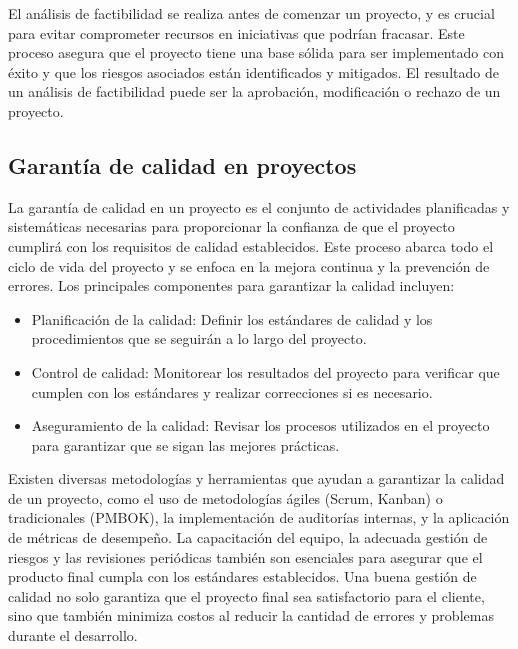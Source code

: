 \documentclass[12pt]{article}
\begin{document}
El análisis de factibilidad se realiza antes de comenzar un proyecto, y es crucial para evitar comprometer recursos en iniciativas que podrían fracasar. Este proceso asegura que el proyecto tiene una base sólida para ser implementado con éxito y que los riesgos asociados están identificados y mitigados. El resultado de un análisis de factibilidad puede ser la aprobación, modificación o rechazo de un proyecto.
\cite{wikipediaFactibilidad}

\subsection*{Garantía de calidad en proyectos}
La garantía de calidad en un proyecto es el conjunto de actividades planificadas y sistemáticas necesarias para proporcionar la confianza de que el proyecto cumplirá con los requisitos de calidad establecidos. Este proceso abarca todo el ciclo de vida del proyecto y se enfoca en la mejora continua y la prevención de errores. Los principales componentes para garantizar la calidad incluyen:

\begin{itemize}
    \item Planificación de la calidad: Definir los estándares de calidad y los procedimientos que se seguirán a lo largo del proyecto.
    \item Control de calidad: Monitorear los resultados del proyecto para verificar que cumplen con los estándares y realizar correcciones si es necesario.
    \item Aseguramiento de la calidad: Revisar los procesos utilizados en el proyecto para garantizar que se sigan las mejores prácticas.
\end{itemize}
Existen diversas metodologías y herramientas que ayudan a garantizar la calidad de un proyecto, como el uso de metodologías ágiles (Scrum, Kanban) o tradicionales (PMBOK), la implementación de auditorías internas, y la aplicación de métricas de desempeño. La capacitación del equipo, la adecuada gestión de riesgos y las revisiones periódicas también son esenciales para asegurar que el producto final cumpla con los estándares establecidos. Una buena gestión de calidad no solo garantiza que el proyecto final sea satisfactorio para el cliente, sino que también minimiza costos al reducir la cantidad de errores y problemas durante el desarrollo.
\cite{bitrixCalidadProyecto}
\end{document}
